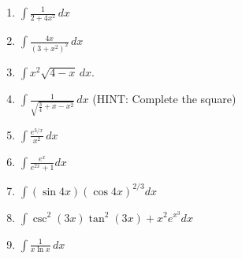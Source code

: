\documentclass[12pt]{article}
\newif\ifans
\begin{document}
\begin{enumerate}
\ifans{\fbox{$2e^{\sqrt{x}}-\frac{1}{16}\sin{(4x)}+C$}} \fi

\item $\int \frac{1}{2+4x^2} \,dx$ 

\ifans{\fbox{$\frac{1}{2\sqrt{2}}\arctan{(\sqrt{2}x)}+C$; Video Solution: \textcolor{blue}{\href{http://www.youtube.com/watch?v=HVA-eDtKsG4}{http://www.youtube.com/watch?v=HVA-eDtKsG4}} %
}} \fi

\item $\int \frac{4x}{(3+x^2)^2} \,dx$ 

\ifans{\fbox{$-2(3+x^2)^{-1}+C$}} \fi

\item $\int x^2\sqrt{4-x} \,dx$. 

\ifans{\fbox{$-\frac{32}{3}(4-x)^{3/2}+\frac{16}{5}(4-x)^{5/2}-\frac{2}{7}(4-x)^{7/2}+C$}} \fi

\newpage

\item $\int \frac{1}{\sqrt{\frac{3}{4}+x-x^2}} \,dx$ (HINT: Complete the square)

\ifans{\fbox{$\arcsin{\left(x-\frac{1}{2}\right)}+C$; Detailed Solution: \textcolor{blue}{\href{http://www.math.drexel.edu/classes/Calculus/resources/Math122HW/Solutions/122_05_Substitution_15.pdf}{Here}}}} \fi

\item $\int{\frac{e^{3/x}}{x^2}} \,dx$

\ifans{\fbox{$-\frac{1}{3}e^{3/x}+C$; Detailed Solution: \textcolor{blue}{\href{http://www.math.drexel.edu/classes/Calculus/resources/Math122HW/Solutions/122_05_Substitution_16.pdf}{Here}}}} \fi

\item $\int \frac{e^x}{e^{2x}+1}dx$ 

\ifans{\fbox{$\tan^{-1}{(e^x)}+C$}} \fi

\item $\int (\sin{4x})(\cos{4x})^{2/3}dx$ 

\ifans{\fbox{$-\frac{3}{20}(\cos{4x})^{5/3}+C$}} \fi

\item $\int \csc^{2}{(3x)}\tan^{2}{(3x)}+x^2e^{x^3}dx$ 

\ifans{\fbox{$\frac{1}{3}\tan{(3x)}+\frac{1}{3}e^{x^3}+C$}} \fi

\item $\int \frac{1}{x\ln{x}} \,dx$


\end{enumerate}
\end{document}
